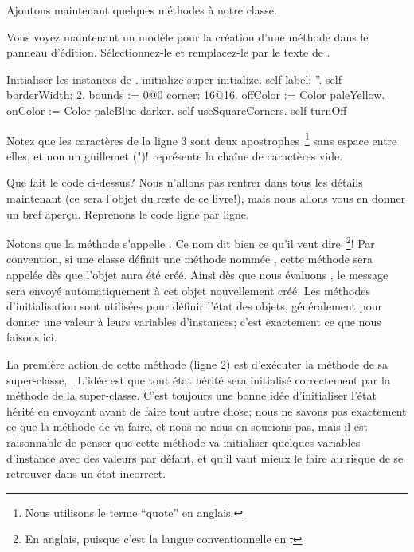\documentclass[a4paper,10pt,twoside]{book}
\begin{document}
Ajoutons maintenant quelques méthodes à notre classe.

Vous voyez maintenant un modèle pour la création d'une méthode dans le panneau d'édition.
Sélectionnez-le et remplacez-le par le texte de .

\begin{numMethod}[scbecellinitialize]{Initialiser les instances de .}
initialize
   super initialize.
   self label: ''.
   self borderWidth: 2.
   bounds := 0@0 corner: 16@16.
   offColor := Color paleYellow.
   onColor := Color paleBlue darker.
   self useSquareCorners.
   self turnOff
\end{numMethod}

\noindent
Notez que les caractères  de la ligne 3 sont deux
apostrophes~\footnote{Nous utilisons le terme ``quote'' en anglais.} 
sans espace entre elles, et non un guillemet (")!
 représente la chaîne de caractères vide.


Que fait le code ci-dessus?  Nous n'allons pas rentrer dans tous les
détails maintenant (ce sera l'objet du reste de ce livre!), mais nous
allons vous en donner un bref aperçu. Reprenons le code ligne par ligne.

Notons que la méthode s'appelle .
Ce nom dit bien ce qu'il veut dire~\footnote{En anglais, puisque c'est
  la langue conventionnelle en \st.}!
Par convention, si une classe définit une méthode nommée
, cette méthode sera appelée dès que l'objet aura été créé.
Ainsi dès que nous évaluons , le message  sera envoyé automatiquement à cet objet nouvellement créé.
Les méthodes d'initialisation sont utilisées pour définir l'état des objets, généralement pour donner une valeur à leurs variables d'instances; c'est exactement ce que nous faisons ici.

La première action de cette méthode (ligne 2) est d'exécuter la méthode  de sa super-classe, .
L'idée est que tout état hérité sera initialisé correctement par la méthode  de la super-classe.
C'est toujours une bonne idée d'initialiser l'état hérité en envoyant
 avant de faire tout autre chose; nous ne savons
pas exactement ce que la méthode  de
 va faire, et nous ne nous en soucions pas, mais
il est raisonnable de penser que cette méthode va initialiser quelques
variables d'instance avec des valeurs par défaut, et qu'il vaut mieux
le faire au risque de se retrouver dans un état incorrect.
\end{document}
